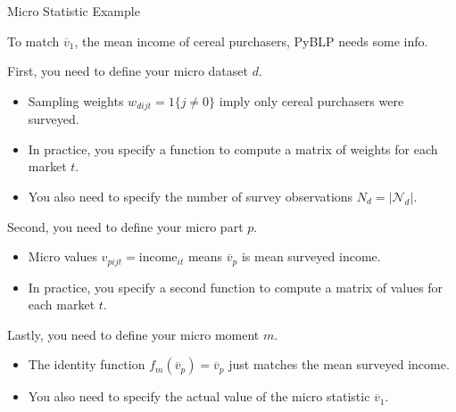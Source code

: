 \documentclass[aspectratio=169,t,11pt,table]{beamer}
\begin{document}
\begin{frame}{Micro Statistic Example}
    \begin{wideitemize}
        \item To match $\overline{v}_1$, the mean income of cereal purchasers, PyBLP needs some info.
        \pause
        \item First, you need to define your \alert{micro dataset} $d$.
        \begin{itemize}
            \item Sampling weights $w_{dijt} = 1\{j \neq 0\}$ imply only cereal purchasers were surveyed.
            \item In practice, you specify a function to compute a matrix of weights for each market $t$.
            \item You also need to specify the number of survey observations $N_d = |\mathcal{N}_d|$.
        \end{itemize}
        \pause
        \item Second, you need to define your \alert{micro part} $p$.
        \begin{itemize}
            \item Micro values $v_{pijt} = \text{income}_{it}$ means $\overline{v}_p$ is mean surveyed income.
            \item In practice, you specify a second function to compute a matrix of values for each market $t$.
        \end{itemize}
        \pause
        \item Lastly, you need to define your \alert{micro moment} $m$.
        \begin{itemize}
            \item The identity function $f_m(\overline{v}_p) = \overline{v}_p$ just matches the mean surveyed income.
            \item You also need to specify the actual value of the micro statistic $\overline{v}_1$.
        \end{itemize}
    \end{wideitemize}
\end{frame}
\end{document}
